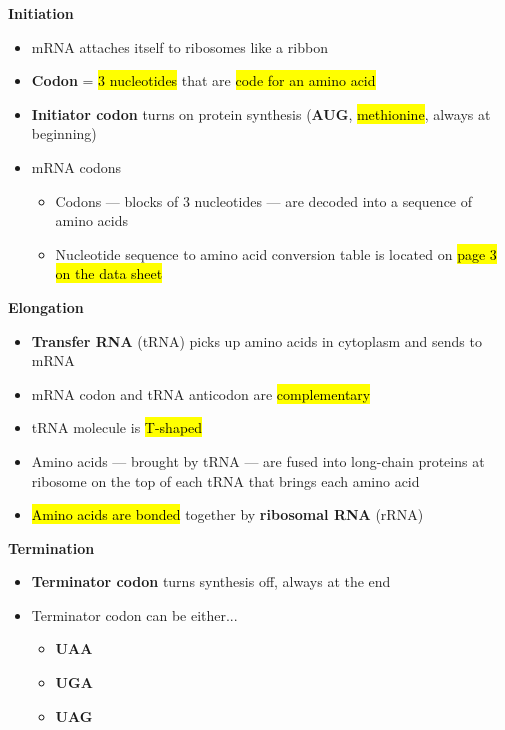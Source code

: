 \documentclass[a4paper,12pt]{article}
\begin{document}
\textbf{Initiation}
\begin{itemize}
    \item{mRNA attaches itself to ribosomes like a ribbon}
    \item{\textbf{Codon} = \hl{3 nucleotides} that are \hl{code for an amino acid}}
    \item{\textbf{Initiator codon} turns on protein synthesis (\textbf{AUG}, \hl{methionine}, always at beginning)}
    \item{
            mRNA codons
            \begin{itemize}
                \item{Codons --- blocks of 3 nucleotides --- are decoded into a sequence of amino acids}
                \item{Nucleotide sequence to amino acid conversion table is located on \hl{page 3 on the data sheet}}
            \end{itemize}
        }
\end{itemize}

\textbf{Elongation}
\begin{itemize}
    \item{\textbf{Transfer RNA} (tRNA) picks up amino acids in cytoplasm and sends to mRNA}
    \item{mRNA codon and tRNA anticodon are \hl{complementary}}
    \item{tRNA molecule is \hl{T-shaped}}
    \item{Amino acids --- brought by tRNA --- are fused into long-chain proteins at ribosome on the top of each tRNA that brings each amino acid}
    \item{\hl{Amino acids are bonded} together by \textbf{ribosomal RNA} (rRNA)}
\end{itemize}

\textbf{Termination}
\begin{itemize}
    \item{\textbf{Terminator codon} turns synthesis off, always at the end}
    \item{
            Terminator codon can be either...
            \begin{itemize}
                \item{\textbf{UAA}}
                \item{\textbf{UGA}}
                \item{\textbf{UAG}}
            \end{itemize}
        }
\end{itemize}
\end{document}
